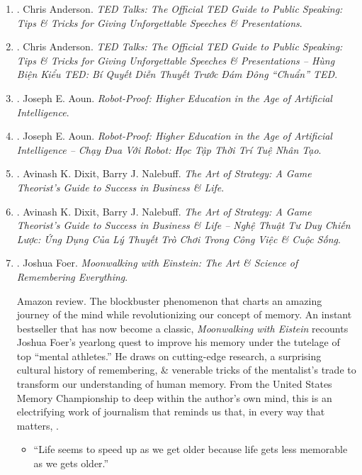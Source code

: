 \documentclass{article}
\begin{document}
\begin{enumerate}
	\item \cite{Anderson_TED}. {\sc Chris Anderson}. {\it TED Talks: The Official TED Guide to Public Speaking: Tips \& Tricks for Giving Unforgettable Speeches \& Presentations}.\hfill{\sf[reading]}
	
	\item \cite{Anderson_TED_VN}. {\sc Chris Anderson}. {\it TED Talks: The Official TED Guide to Public Speaking: Tips \& Tricks for Giving Unforgettable Speeches \& Presentations -- Hùng Biện Kiểu TED: Bí Quyết Diễn Thuyết Trước Đám Đông ``Chuẩn'' TED}.\hfill{\sf[done]}
	
	\item \cite{Aoun_robot-proof}. {\sc Joseph E. Aoun}. {\it Robot-Proof: Higher Education in the Age of Artificial Intelligence}.
	
	\item \cite{Aoun_robot-proof_VN}. {\sc Joseph E. Aoun}. {\it Robot-Proof: Higher Education in the Age of Artificial Intelligence -- Chạy Đua Với Robot: Học Tập Thời Trí Tuệ Nhân Tạo}.\hfill{\sf[done]}
	
	\item \cite{Dixit_Nalebuff2010}. {\sc Avinash K. Dixit, Barry J. Nalebuff}. {\it The Art of Strategy: A Game Theorist's Guide to Success in Business \& Life}.
	
	\item \cite{Dixit_Nalebuff_strategy}. {\sc Avinash K. Dixit, Barry J. Nalebuff}. {\it The Art of Strategy: A Game Theorist's Guide to Success in Business \& Life -- Nghệ Thuật Tư Duy Chiến Lược: Ứng Dụng Của Lý Thuyết Trò Chơi Trong Công Việc \& Cuộc Sống}.\hfill{\sf[done]}
		
	\item \cite{Foer_remember}. {\sc Joshua Foer}. {\it Moonwalking with Einstein: The Art \& Science of Remembering Everything}. {}
	
	{\sf Amazon review.} The blockbuster phenomenon that charts an amazing journey of the mind while revolutionizing our concept of memory. An instant bestseller that has now become a classic, {\it Moonwalking with {\sc Eistein}} recounts {\sc Joshua Foer}'s yearlong quest to improve his memory under the tutelage of top ``mental athletes.'' He draws on cutting-edge research, a surprising cultural history of remembering, \& venerable tricks of the mentalist's trade to transform our understanding of human memory. From the United States Memory Championship to deep within the author's own mind, this is an electrifying work of journalism that reminds us that, in every way that matters, .
	\begin{itemize}
		\item ``Life seems to speed up as we get older because life gets less memorable as we gets older.''
		

\end{itemize}
\end{enumerate}
\end{document}

